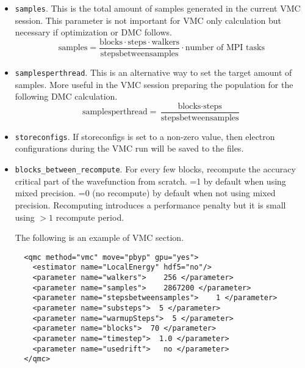 \begin{itemize}
\item \texttt{samples}. This is the total amount of samples generated in the current VMC session. This parameter is not important for VMC only calculation but necessary if optimization or DMC follows.
\[
\textrm{samples}=
\frac{\textrm{blocks}\cdot\textrm{steps}\cdot\textrm{walkers}}{\textrm{stepsbetweensamples}}\cdot\textrm{number of MPI tasks}
\]

\item \texttt{samplesperthread}. This is an alternative way to set the target amount of samples. More useful in the VMC session preparing the population for the following DMC calculation.
\[
\textrm{samplesperthread}=
\frac{\textrm{blocks}\cdot\textrm{steps}}{\textrm{stepsbetweensamples}}
\]
\item \texttt{storeconfigs}. If storeconfigs is set to a non-zero value, then electron configurations during the VMC run will be saved to the files.

\item \texttt{blocks\_between\_recompute}. For every few blocks, recompute the accuracy critical part of the wavefunction from scratch. =1 by default when using mixed precision. =0 (no recompute) by default when not using mixed precision. Recomputing introduces a performance penalty but it is small using $>1$ recompute period.

The following is an example of VMC section.
\begin{lstlisting}
  <qmc method="vmc" move="pbyp" gpu="yes">
    <estimator name="LocalEnergy" hdf5="no"/>
    <parameter name="walkers">    256 </parameter>
    <parameter name="samples">    2867200 </parameter>
    <parameter name="stepsbetweensamples">    1 </parameter>
    <parameter name="substeps">  5 </parameter>
    <parameter name="warmupSteps">  5 </parameter>
    <parameter name="blocks">  70 </parameter>
    <parameter name="timestep">  1.0 </parameter>
    <parameter name="usedrift">   no </parameter>
  </qmc>
\end{lstlisting}


\end{itemize}
